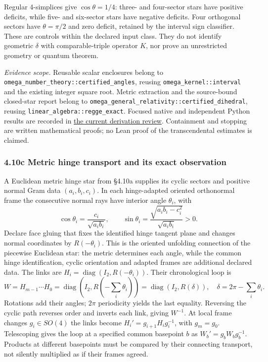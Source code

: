\documentclass[
  english,
  10pt,
  a4paper,
]{article}
\begin{document}
Regular 4-simplices give \(\cos\theta=1/4\): three- and four-sector
stars have positive deficits, while five- and six-sector stars have
negative deficits. Four orthogonal sectors have \(\theta=\pi/2\) and
zero deficit, retained by the interval sign classifier. These are
controls within the declared input class. They do not identify geometric
\(\delta\) with comparable-triple operator \(K\), nor prove an
unrestricted geometry or quantum theorem.

\emph{Evidence scope.} Reusable scalar enclosures belong to
\nolinkurl{omega_number_theory::certified_angles}, reusing
\texttt{omega\_kernel::interval} and the existing integer square root.
Metric extraction and the source-bound closed-star report belong to
\nolinkurl{omega_general_relativity::certified_dihedral}, reusing
\nolinkurl{linear_algebra::regge_exact}. Focused native and independent
Python results are recorded in
\href{docs/loss_incidence_angles_2026_10_14.md}{the current derivation
review}. Containment and stopping are written mathematical proofs; no
Lean proof of the transcendental estimates is claimed.

\subsubsection{4.10c Metric hinge transport and its exact
observation}\label{c-metric-hinge-transport-and-its-exact-observation}

A Euclidean metric hinge star from §4.10a supplies its cyclic sectors
and positive normal Gram data \((a_i,b_i,c_i)\). In each hinge-adapted
oriented orthonormal frame the consecutive normal rays have interior
angle \(\theta_i\), with \[
\cos\theta_i=\frac{c_i}{\sqrt{a_ib_i}},\qquad
\sin\theta_i=\frac{\sqrt{a_ib_i-c_i^2}}{\sqrt{a_ib_i}}>0.
\] Declare face gluing that fixes the identified hinge tangent plane and
changes normal coordinates by \(R(-\theta_i)\). This is the oriented
unfolding connection of the piecewise Euclidean star: the metric
determines each angle, while the common hinge identification, cyclic
orientation and adapted frames are additional declared data. The links
are \(H_i=\operatorname{diag}(I_2,R(-\theta_i))\). Their chronological
loop is \[
W=H_{m-1}\cdots H_0
=\operatorname{diag}(I_2,R(-\sum_i\theta_i))
=\operatorname{diag}(I_2,R(\delta)),\quad
\delta=2\pi-\sum_i\theta_i.
\] Rotations add their angles; \(2\pi\) periodicity yields the last
equality. Reversing the cyclic path reverses order and inverts each
link, giving \(W^{-1}\). At local frame changes \(g_i\in SO(4)\) the
links become \(H_i'=g_{i+1}H_ig_i^{-1}\), with \(g_m=g_0\). Telescoping
gives the loop at a specified common basepoint \(b\) as
\(W_b'=g_bW_bg_b^{-1}\). Products at different basepoints must be
compared by their connecting transport, not silently multiplied as if
their frames agreed.
\end{document}
